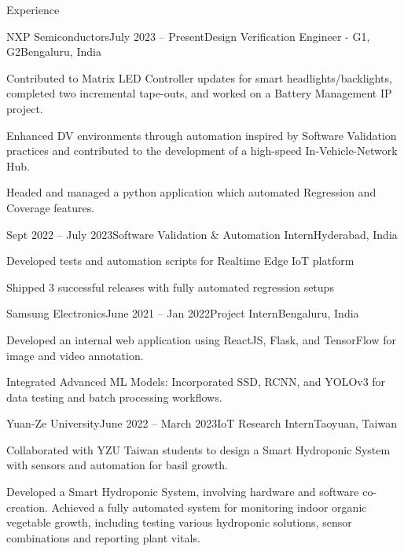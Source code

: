 \documentclass{resume}
\begin{document}
\begin{rSection}{Experience}

\begin{rSubsection}{NXP Semiconductors}{July 2023 – Present}{Design Verification Engineer - G1, G2}{Bengaluru, India}
    \item Contributed to Matrix LED Controller updates for smart headlights/backlights, completed two incremental tape-outs, and worked on a Battery Management IP project.
    \item Enhanced DV environments through automation inspired by Software Validation practices and contributed to the development of a high-speed In-Vehicle-Network Hub.
    \item Headed and managed a python application which automated Regression and Coverage features.
\end{rSubsection}

\begin{rSubsection}{}{Sept 2022 – July 2023}{Software Validation \& Automation Intern}{Hyderabad, India}
    \item Developed tests and automation scripts for Realtime Edge IoT platform
    \item Shipped 3 successful releases with fully automated regression setups
\end{rSubsection}

\begin{rSubsection}{Samsung Electronics}{June 2021 – Jan 2022}{Project Intern}{Bengaluru, India}
    \item Developed an internal web application using ReactJS, Flask, and TensorFlow for image and video annotation.
    \item Integrated Advanced ML Models: Incorporated SSD, RCNN, and YOLOv3 for data testing and batch processing workflows.
\end{rSubsection}

\begin{rSubsection}{Yuan-Ze University}{June 2022 – March 2023}{IoT Research Intern}{Taoyuan, Taiwan}
    \item Collaborated with YZU Taiwan students to design a Smart Hydroponic System with sensors and automation for basil growth.
    \item Developed a Smart Hydroponic System, involving hardware and software co-creation. Achieved a fully automated system for monitoring indoor organic vegetable growth, including testing various hydroponic solutions, sensor combinations and reporting plant vitals.
\end{rSubsection}



\end{rSection}
\end{document}
